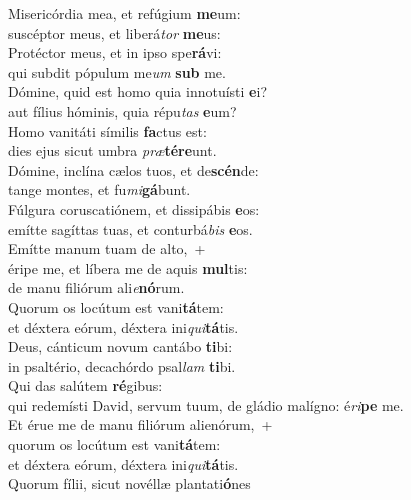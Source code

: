 \evenverse Misericórdia mea, et refúgium \textbf{me}um:~\*\\
\evenverse suscéptor meus, et liberá\textit{tor} \textbf{me}us:\\
\oddverse Protéctor meus, et in ipso spe\textbf{rá}vi:~\*\\
\oddverse qui subdit pópulum me\textit{um} \textbf{sub} me.\\
\evenverse Dómine, quid est homo quia innotuísti \textbf{e}i?~\*\\
\evenverse aut fílius hóminis, quia répu\textit{tas} \textbf{e}um?\\
\oddverse Homo vanitáti símilis \textbf{fa}ctus est:~\*\\
\oddverse dies ejus sicut umbra \textit{præ}\textbf{té}\textbf{re}unt.\\
\evenverse Dómine, inclína cælos tuos, et de\textbf{scén}de:~\*\\
\evenverse tange montes, et fu\textit{mi}\textbf{gá}bunt.\\
\oddverse Fúlgura coruscatiónem, et dissipábis \textbf{e}os:~\*\\
\oddverse emítte sagíttas tuas, et conturbá\textit{bis} \textbf{e}os.\\
\evenverse Emítte manum tuam de alto,~+\\
\evenverse  éripe me, et líbera me de aquis \textbf{mul}tis:~\*\\
\evenverse de manu filiórum ali\textit{e}\textbf{nó}rum.\\
\oddverse Quorum os locútum est vani\textbf{tá}tem:~\*\\
\oddverse et déxtera eórum, déxtera ini\textit{qui}\textbf{tá}tis.\\
\evenverse Deus, cánticum novum cantábo \textbf{ti}bi:~\*\\
\evenverse in psaltério, decachórdo psal\textit{lam} \textbf{ti}bi.\\
\oddverse Qui das salútem \textbf{ré}gibus:~\*\\
\oddverse qui redemísti David, servum tuum, de gládio malígno: é\textit{ri}\textbf{pe} me.\\
\evenverse Et érue me de manu filiórum alienórum,~+\\
\evenverse  quorum os locútum est vani\textbf{tá}tem:~\*\\
\evenverse et déxtera eórum, déxtera ini\textit{qui}\textbf{tá}tis.\\
\oddverse Quorum fílii, sicut novéllæ plantati\textbf{ó}nes~\*\\
